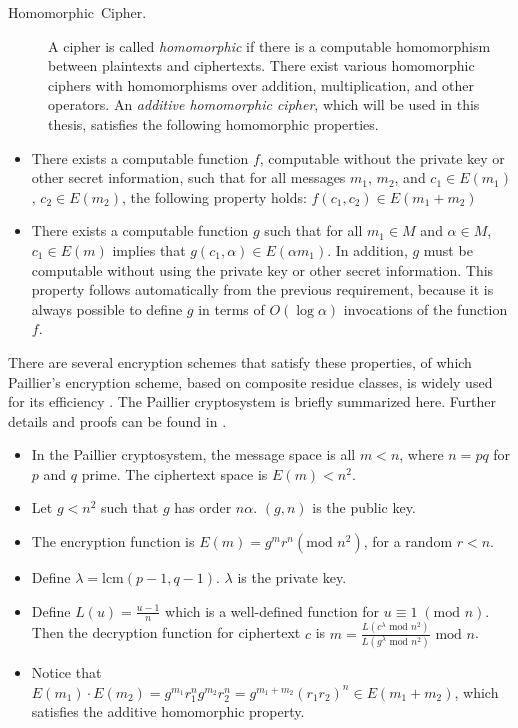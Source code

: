 \begin{description}
\item [{Homomorphic~Cipher.}] A cipher is called \emph{homomorphic} if
there is a computable homomorphism between plaintexts and ciphertexts.
There exist various homomorphic ciphers with homomorphisms over addition,
multiplication, and other operators. An \emph{additive homomorphic
cipher}, which will be used in this thesis, satisfies the following
homomorphic properties.\end{description}
\begin{itemize}
\item There exists a computable function $f$, computable without the private
key or other secret information, such that for all messages $m_{1}$,
$m_{2}$, and $c_{1}\in E(m_{1})$, $c_{2}\in E(m_{2})$, the following
property holds:  $f\left(c_{1},c_{2}\right)\in E(m_{1}+m_{2})$ 
\item There exists a computable function $g$ such that for all $m_{1}\in M$
and $\alpha\in M$, $c_{1}\in E(m)$ implies that $g(c_{1},\alpha)\in E(\alpha m_{1})$.
In addition, $g$ must be computable without using the private key
or other secret information. This property follows automatically from
the previous requirement, because it is always possible to define
$g$ in terms of $O(\log\alpha)$ invocations of the function $f$. 
\end{itemize}
There are several encryption schemes that satisfy these properties,
of which Paillier's encryption scheme, based on composite residue
classes, is widely used for its efficiency \cite{Paillier99}.  The
Paillier cryptosystem is briefly summarized here.  Further details and
proofs can be found in \cite{Paillier99}.
\begin{itemize}
\item In
the Paillier cryptosystem, the message space is all $m<n$, where
$n=pq$ for $p$ and $q$ prime. The ciphertext space is $E(m)<n^{2}$.
\item Let $g<n^{2}$ such that $g$ has order $n\alpha$.  $(g,n)$ is the public key.
\item The encryption function is $E(m)=g^{m}r^{n}\left(\mbox{mod }n^{2}\right)$,
for a random $r<n$. 
\item Define $\lambda=\mbox{lcm}(p-1,q-1)$.  $\lambda$ is the private key.
\item
Define $L(u)=\frac{u-1}{n}$ which is a well-defined function for $u\equiv1\;(\mbox{mod }n)$.  Then the decryption function for ciphertext $c$ is 
$m=\frac{L\left(c^{\lambda}\mbox{ mod }n^{2}\right)}{L\left(g^{\lambda}\mbox{ mod }n^{2}\right)}\mbox{ mod }n$.

\item Notice that $E(m_{1})\cdot E(m_{2})=g^{m_{1}}r_{1}^{n}g^{m_{2}}r_{2}^{n}=g^{m_{1}+m_{2}}(r_{1}r_{2})^{n}\in E(m_{1}+m_{2})$,
which satisfies the additive homomorphic property. 



\end{itemize}
